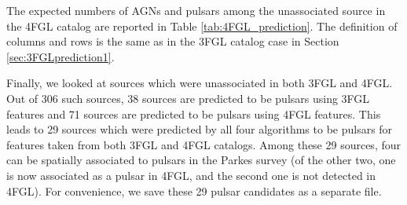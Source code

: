 \begin{table}[!h]
    \vspace{0.2cm}
    \caption{Accuracy of the 4 selected algorithms on 4FG associated data.}
    \label{tab:selected_algs2}
\end{table}

The expected numbers of AGNs and pulsars among the unassociated source in the 4FGL catalog are reported in Table \ref{tab:4FGL_prediction}.
The definition of columns and rows is the same as in the 3FGL catalog case in Section \ref{sec:3FGLprediction1}.

\begin{table}[!h]
    \vspace{0.2cm}
    \caption{For definitions see Table \ref{tab:3FGL_prediction}.}
    \label{tab:4FGL_prediction}
\end{table}

Finally, we looked at sources which were unassociated in both 3FGL and 4FGL. Out of 306 such sources, 38 sources are predicted to be pulsars using 3FGL features and 71 sources are predicted to be pulsars using 4FGL features. This leads to 29 sources which were predicted by all four algorithms to be pulsars for features taken from both 3FGL and 4FGL catalogs. Among these 29 sources, four can be spatially associated to pulsars in the Parkes survey (of the other two, one is now associated as a pulsar in 4FGL, and the second one is not detected in 4FGL).  For convenience, we save these 29 pulsar candidates as a separate file.




